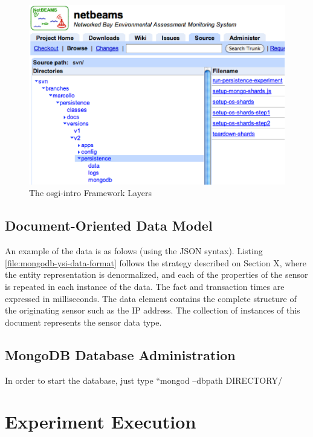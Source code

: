\begin{figure}[!h]
  \centering
  \includegraphics[scale=0.5]{../diagrams/dsp-persistence-system-dir}
  \caption{The osgi-intro Framework Layers}
  \label{fig:dsp-persistence-system-dir}
\end{figure}

\subsection{Document-Oriented Data Model}

An example of the data is as folows (using the JSON syntax). Listing
\ref{file:mongodb-ysi-data-format} follows the strategy described on Section X,
where the entity representation is denormalized, and each of the properties of
the sensor is repeated in each instance of the data. The fact and transaction
times are expressed in milliseconds. The data element contains the complete
structure of the originating sensor such as the IP address. The collection of
instances of this document represents the sensor data type.

\subsection{MongoDB Database Administration}

In order to start the database, just type ``mongod --dbpath DIRECTORY/

\section{Experiment Execution}
\label{sec:experiment-execution}

